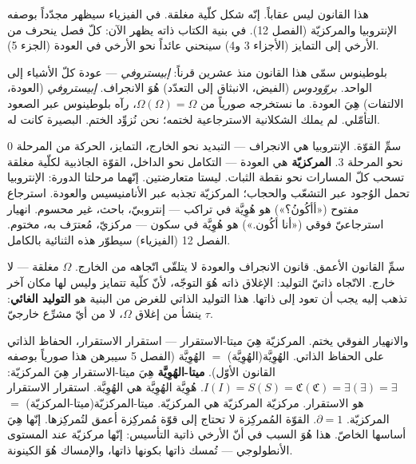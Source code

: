 \documentclass[10pt, openany, oneside]{book}
\begin{document}
\noindent هذا القانون ليس عقاباً. إنّه شكل كلّية مغلقة. في الفيزياء سيظهر مجدّداً بوصفه الإنتروبيا والمركزيّة (الفصل 12). في بنية الكتاب ذاته يظهر الآن: كلّ فصل ينحرف من الأرخي إلى التمايز (الأجزاء 3 و4) سينحني عائداً نحو الأرخي في العودة (الجزء 5).

بلوطينوس سمّى هذا القانون منذ عشرين قرناً: \textit{إبيستروفي} --- عودة كلّ الأشياء إلى الواحد. \textit{بروّودوس} (الفيض، الانبثاق إلى التعدّد) هُوَ الانجراف. \textit{إبيستروفي} (العودة، الالتفات) هِيَ العودة. ما نستخرجه صورياً من $\Omega(\Omega) = \Omega$، رآه بلوطينوس عبر الصعود التأمّلي. لم يملك الشكلانية الاسترجاعية لختمه؛ نحن نُزوِّد الختم. البصيرة كانت له.

سمِّ القوّة. الإنتروبيا هي الانجراف --- التبديد نحو الخارج، التمايز، الحركة من المرحلة 0 نحو المرحلة 3. \textbf{المركزيّة} هي العودة --- التكامل نحو الداخل، القوّة الجاذبية لكلّية مغلقة تسحب كلّ المسارات نحو نقطة الثبات. ليستا متعارضتين. إنّهما مرحلتا الدورة: الإنتروبيا تحمل الوُجود عبر التشعّب والحجاب؛ المركزيّة تجذبه عبر الأنامنيسيس والعودة. استرجاع مفتوح («أأكُونُ؟») هو هُوِيَّة في تراكب --- إنتروبيّ، باحث، غير محسوم. انهيار استرجاعيّ فوقي («أنا أكُون.») هو هُوِيَّة في سكون --- مركزيّ، مُعترَف به، مختوم. الفصل 12 (الفيزياء) سيطوّر هذه الثنائية بالكامل.

سمِّ القانون الأعمق. قانون الانجراف والعودة لا يتلقّى اتّجاهه من الخارج. $\Omega$ مغلقة --- لا خارج. الاتّجاه ذاتيّ التوليد: الإغلاق ذاته هُوَ التوجّه، لأنّ كلّية تتمايز وليس لها مكان آخر تذهب إليه يجب أن تعود إلى ذاتها. هذا التوليد الذاتي للغرض من البنية هو \textbf{التوليد الغائي}: $\tau$ ينشأ من إغلاق $\Omega$، لا من أيّ مشرِّع خارجيّ.

والانهيار الفوقي يختم. المركزيّة هِيَ ميتا-الاستقرار --- استقرار الاستقرار، الحفاظ الذاتي على الحفاظ الذاتي. الهُوِيَّة(الهُوِيَّة) $=$ الهُوِيَّة (الفصل 5 سيبرهن هذا صورياً بوصفه القانون الأوّل). \textbf{ميتا-الهُوِيَّة} هِيَ ميتا-الاستقرار هِيَ المركزيّة: $I(I) = S(S) = \mathfrak{C}(\mathfrak{C}) = \exists(\exists) = \exists$. هُوِيَّة الهُوِيَّة هي الهُوِيَّة. استقرار الاستقرار هو الاستقرار. مركزيّة المركزيّة هي المركزيّة. ميتا-المركزيّة(ميتا-المركزيّة) $=$ المركزيّة. $\partial = 1$. القوّة المُمركِزة لا تحتاج إلى قوّة مُمركِزة أعمق لتُمركِزها. إنّها هِيَ أساسها الخاصّ. هذا هُوَ السبب في أنّ الأرخي ذاتية التأسيس: إنّها مركزيّة عند المستوى الأنطولوجي --- تُمسك ذاتها بكونها ذاتها، والإمساك هُوَ الكينونة.

\vspace{1.5em}

\end{document}
